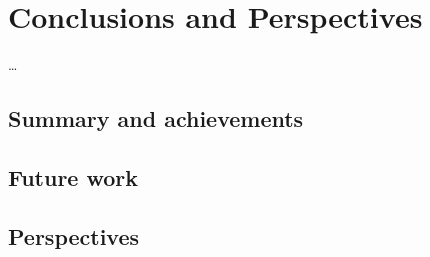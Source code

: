 \chapter{Conclusions and Perspectives}\label{ch:conclusion}

\ldots

\instructionsconclusions


\section{Summary and achievements}

\section{Future work}

\section{Perspectives}

\cleardoublepage

